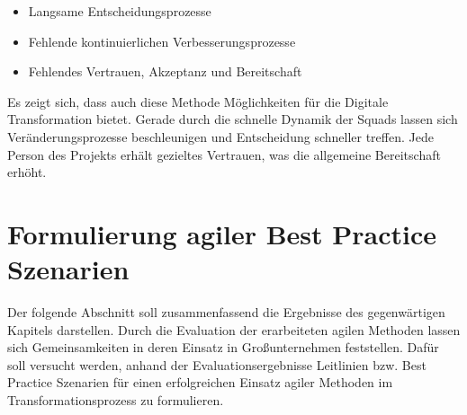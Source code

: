  \begin{itemize}[noitemsep, topsep=0pt]
 	\item Langsame Entscheidungsprozesse
 	\item Fehlende kontinuierlichen Verbesserungsprozesse
 	\item Fehlendes Vertrauen, Akzeptanz und Bereitschaft
 \end{itemize}

Es zeigt sich, dass auch diese Methode Möglichkeiten für die Digitale Transformation bietet. Gerade durch die schnelle Dynamik der Squads lassen sich Veränderungsprozesse beschleunigen und Entscheidung schneller treffen. Jede Person des Projekts erhält gezieltes Vertrauen, was die allgemeine Bereitschaft erhöht.

\section{Formulierung agiler Best Practice Szenarien}
\label{agilepractices:bestpractice}


Der folgende Abschnitt soll zusammenfassend die Ergebnisse des gegenwärtigen Kapitels darstellen. Durch die Evaluation der erarbeiteten agilen Methoden lassen sich Gemeinsamkeiten in deren Einsatz in Großunternehmen feststellen. Dafür soll versucht werden, anhand der Evaluationsergebnisse Leitlinien bzw. Best Practice Szenarien für einen erfolgreichen Einsatz agiler Methoden im Transformationsprozess zu formulieren. 

